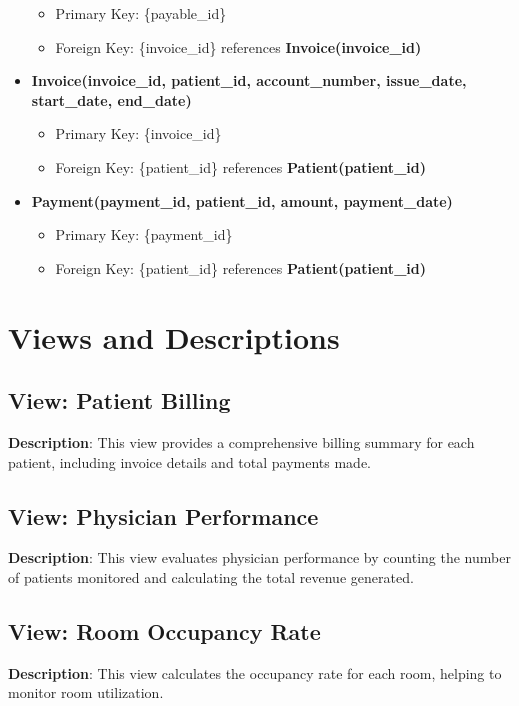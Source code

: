 \documentclass[a4paper,11pt]{article}
\theoremstyle{mytheor}
\begin{document}
\begin{itemize}
\begin{itemize}
            \item Primary Key: \{payable\_id\}
            \item Foreign Key: \{invoice\_id\} references \textbf{Invoice(invoice\_id)}
        \end{itemize}
    \item \textbf{Invoice(invoice\_id, patient\_id, account\_number, issue\_date, start\_date, end\_date)}
        \begin{itemize}
            \item Primary Key: \{invoice\_id\}
            \item Foreign Key: \{patient\_id\} references \textbf{Patient(patient\_id)}
        \end{itemize}
    \item \textbf{Payment(payment\_id, patient\_id, amount, payment\_date)}
        \begin{itemize}
            \item Primary Key: \{payment\_id\}
            \item Foreign Key: \{patient\_id\} references \textbf{Patient(patient\_id)}
        \end{itemize}
\end{itemize}

\section{Views and Descriptions}
\subsection{View: Patient Billing}

\textbf{Description}: This view provides a comprehensive billing summary for each patient, including invoice details and total payments made.

\subsection{View: Physician Performance}

\textbf{Description}: This view evaluates physician performance by counting the number of patients monitored and calculating the total revenue generated.

\subsection{View: Room Occupancy Rate}

\textbf{Description}: This view calculates the occupancy rate for each room, helping to monitor room utilization.
\end{document}

